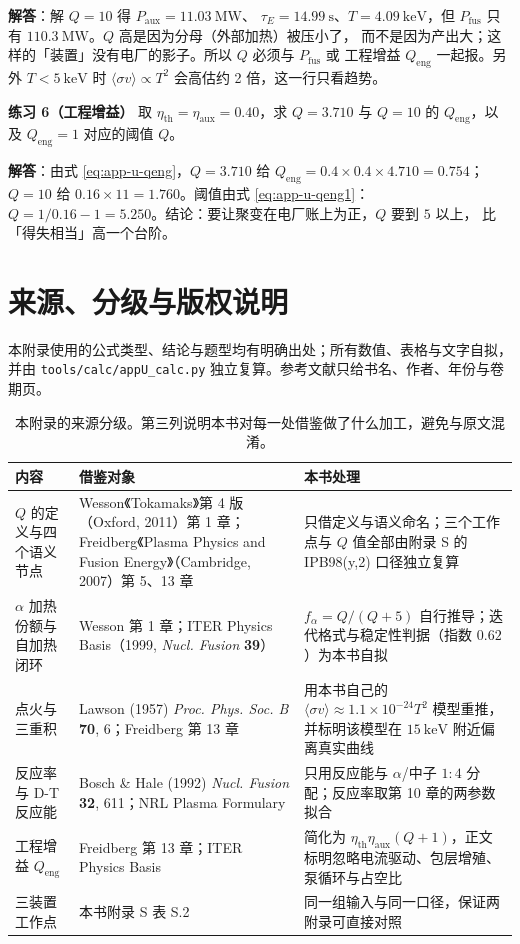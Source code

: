 \textbf{解答}：解 $Q=10$ 得 $P_{\mathrm{aux}} = 11.03\ \mathrm{MW}$、
$\tau_E = 14.99\ \mathrm{s}$、$T = 4.09\ \mathrm{keV}$，但
$P_{\mathrm{fus}}$ 只有 $110.3\ \mathrm{MW}$。$Q$ 高是因为分母（外部加热）被压小了，
而不是因为产出大；这样的「装置」没有电厂的影子。所以 $Q$ 必须与 $P_{\mathrm{fus}}$ 或
工程增益 $Q_{\mathrm{eng}}$ 一起报。另外 $T<5\ \mathrm{keV}$ 时
$\langle\sigma v\rangle\propto T^2$ 会高估约 2 倍，这一行只看趋势。

\textbf{练习 6（工程增益）}
取 $\eta_{\mathrm{th}} = \eta_{\mathrm{aux}} = 0.40$，求 $Q=3.710$ 与 $Q=10$ 的
$Q_{\mathrm{eng}}$，以及 $Q_{\mathrm{eng}}=1$ 对应的阈值 $Q$。

\textbf{解答}：由式 \eqref{eq:app-u-qeng}，$Q=3.710$ 给
$Q_{\mathrm{eng}} = 0.4\times0.4\times4.710 = 0.754$；$Q=10$ 给
$0.16\times11 = 1.760$。阈值由式 \eqref{eq:app-u-qeng1}：
$Q = 1/0.16 - 1 = 5.250$。结论：要让聚变在电厂账上为正，$Q$ 要到 $5$ 以上，
比「得失相当」高一个台阶。

\section{来源、分级与版权说明}
\label{sec:app-u-source}

\begingroup\small
本附录使用的公式类型、结论与题型均有明确出处；所有数值、表格与文字自拟，并由
\texttt{tools/\allowbreak{}calc/\allowbreak{}appU\_calc.py} 独立复算。参考文献只给书名、作者、年份与卷期页。

\begin{table}[htbp]
\centering
\small
\caption{本附录的来源分级。第三列说明本书对每一处借鉴做了什么加工，避免与原文混淆。}
\label{tab:app-u-source}
\begin{tabular}{@{}p{3.4cm}p{5.0cm}p{6.0cm}@{}}
\toprule
内容 & 借鉴对象 & 本书处理 \\
\midrule
$Q$ 的定义与四个语义节点 & Wesson《Tokamaks》第 4 版（Oxford, 2011）第 1 章；Freidberg《Plasma Physics and Fusion Energy》（Cambridge, 2007）第 5、13 章 & 只借定义与语义命名；三个工作点与 $Q$ 值全部由附录 S 的 IPB98(y,2) 口径独立复算 \\
$\alpha$ 加热份额与自加热闭环 & Wesson 第 1 章；ITER Physics Basis（1999, \textit{Nucl. Fusion} \textbf{39}） & $f_\alpha = Q/(Q+5)$ 自行推导；迭代格式与稳定性判据（指数 $0.62$）为本书自拟 \\
点火与三重积 & Lawson (1957) \textit{Proc. Phys. Soc. B} \textbf{70}, 6；Freidberg 第 13 章 & 用本书自己的 $\langle\sigma v\rangle \approx 1.1\times10^{-24}T^2$ 模型重推，并标明该模型在 $15\ \mathrm{keV}$ 附近偏离真实曲线 \\
反应率与 D-T 反应能 & Bosch \& Hale (1992) \textit{Nucl. Fusion} \textbf{32}, 611；NRL Plasma Formulary & 只用反应能与 $\alpha$/中子 $1:4$ 分配；反应率取第 10 章的两参数拟合 \\
工程增益 $Q_{\mathrm{eng}}$ & Freidberg 第 13 章；ITER Physics Basis & 简化为 $\eta_{\mathrm{th}}\eta_{\mathrm{aux}}(Q+1)$，正文标明忽略电流驱动、包层增殖、泵循环与占空比 \\
三装置工作点 & 本书附录 S 表 S.2 & 同一组输入与同一口径，保证两附录可直接对照 \\
\bottomrule
\end{tabular}

\end{table}

